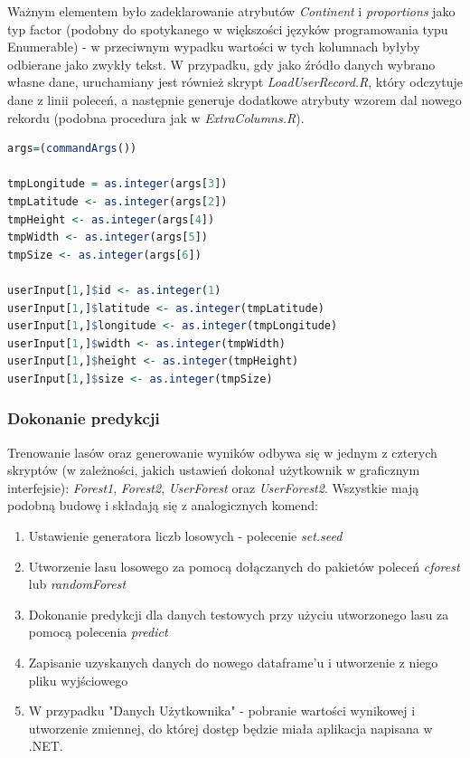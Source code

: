 \documentclass[a4paper,twoside]{article}
\begin{document}
Ważnym elementem było zadeklarowanie atrybutów \textit{Continent} i \textit{proportions} jako typ factor (podobny do spotykanego w większości języków programowania typu Enumerable) - w przeciwnym wypadku wartości w tych kolumnach byłyby odbierane jako zwykły tekst. W przypadku, gdy jako źródło danych wybrano własne dane, uruchamiany jest również skrypt \textit{LoadUserRecord.R}, który odczytuje dane z linii poleceń, a następnie generuje dodatkowe atrybuty wzorem dal nowego rekordu (podobna procedura jak w \textit{ExtraColumns.R}). \\

\begin{lstlisting}[language=R]
args=(commandArgs())

tmpLongitude = as.integer(args[3])
tmpLatitude <- as.integer(args[2])
tmpHeight <- as.integer(args[4])
tmpWidth <- as.integer(args[5])
tmpSize <- as.integer(args[6])

userInput[1,]$id <- as.integer(1)
userInput[1,]$latitude <- as.integer(tmpLatitude)
userInput[1,]$longitude <- as.integer(tmpLongitude)
userInput[1,]$width <- as.integer(tmpWidth)
userInput[1,]$height <- as.integer(tmpHeight)
userInput[1,]$size <- as.integer(tmpSize)
\end{lstlisting}

\newpage

\subsubsection{Dokonanie predykcji}

Trenowanie lasów oraz generowanie wyników odbywa się w jednym z czterych skryptów (w zależności, jakich ustawień dokonał użytkownik w graficznym interfejsie): \textit{Forest1}, \textit{Forest2}, \textit{UserForest} oraz \textit{UserForest2}. Wszystkie mają podobną budowę i składają się z analogicznych komend:

\begin{enumerate}
	\item Ustawienie generatora liczb losowych - polecenie \textit{set.seed}
	\item Utworzenie lasu losowego za pomocą dołączanych do pakietów poleceń \textit{cforest} lub \textit{randomForest}
	\item Dokonanie predykcji dla danych testowych przy użyciu utworzonego lasu za pomocą polecenia \textit{predict}
	\item Zapisanie uzyskanych danych do nowego dataframe'u i utworzenie z niego pliku wyjściowego
	\item W przypadku "Danych Użytkownika" - pobranie wartości wynikowej i utworzenie zmiennej, do której dostęp będzie miała aplikacja napisana w .NET.
\end{enumerate}
\end{document}
